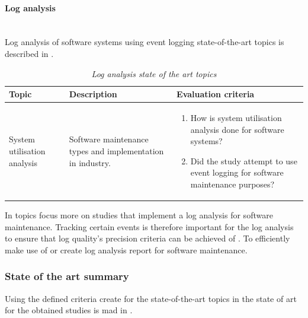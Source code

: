 \clearpage

\paragraph{Log analysis} \leavevmode\\
Log analysis of software systems using event logging state-of-the-art topics is described in .

\begin{table}[!htb]
	\centering
	\caption[Log analysis state of the art topics]
	{\textit{Log analysis state of the art topics}}
	\label{tbl:ch1_soaLogAnalysis}
	\begin{tabularx}{\linewidth}{|l|X|X|}
		\hline \textbf{Topic}  & \textbf{Description} & \textbf{Evaluation criteria}\\
		\hline System utilisation analysis & \RaggedRight Software maintenance types and implementation in industry. & \RaggedRight \begin{enumerate}
			\item How is system utilisation analysis done for software systems?
			\item Did the study attempt to use event logging for software maintenance purposes?
		\end{enumerate} \\
		\hline
	\end{tabularx}
\end{table}

In  topics focus more on studies that implement a log analysis for software maintenance. Tracking certain events is therefore important for the log analysis to ensure that log quality's precision criteria can be achieved of . To efficiently make use of or create log analysis report for software maintenance.

\subsubsection{State of the art summary}
Using the defined criteria create for the state-of-the-art topics in  the state of art for the obtained studies is mad in .

